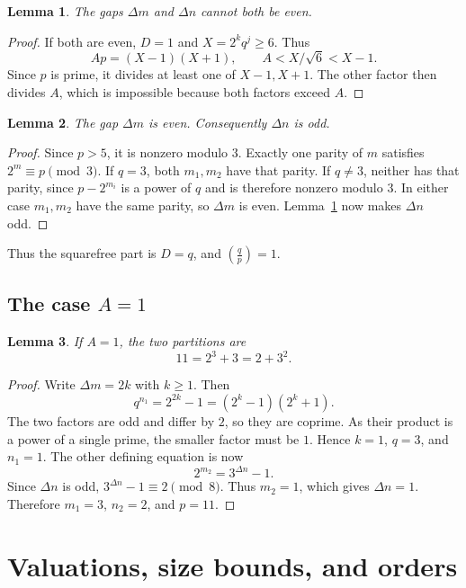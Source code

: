 \documentclass[11pt]{article}
\newtheorem{lemma}{Lemma}
\begin{document}
\begin{lemma}\label{lem:squares}
The gaps $\Delta m$ and $\Delta n$ cannot both be even.
\end{lemma}
\begin{proof}
If both are even, $D=1$ and $X=2^kq^j\geq6$. Thus
\[
Ap=(X-1)(X+1),\qquad A<X/\sqrt6<X-1.
\]
Since $p$ is prime, it divides at least one of $X-1,X+1$.
The other factor then divides $A$, which is impossible because both
factors exceed $A$.
\end{proof}

\begin{lemma}\label{lem:parity}
The gap $\Delta m$ is even. Consequently $\Delta n$ is odd.
\end{lemma}
\begin{proof}
Since $p>5$, it is nonzero modulo $3$. Exactly one parity of $m$
satisfies $2^m\equiv p\pmod3$.
If $q=3$, both $m_1,m_2$ have that parity.
If $q\neq3$, neither has that parity, since $p-2^{m_i}$ is a power
of $q$ and is therefore nonzero modulo $3$.
In either case $m_1,m_2$ have the same parity, so $\Delta m$ is even.
Lemma~\ref{lem:squares} now makes $\Delta n$ odd.
\end{proof}

Thus the squarefree part is $D=q$, and $\left(\frac{q}{p}\right)=1$.

\subsection{\texorpdfstring{The case $A=1$}{The case A=1}}

\begin{lemma}\label{lem:Aone}
If $A=1$, the two partitions are
\[
11=2^3+3=2+3^2.
\]
\end{lemma}
\begin{proof}
Write $\Delta m=2k$ with $k\geq1$. Then
\[
q^{n_1}=2^{2k}-1=(2^k-1)(2^k+1).
\]
The two factors are odd and differ by $2$, so they are coprime.
As their product is a power of a single prime, the smaller factor
must be $1$. Hence $k=1$, $q=3$, and $n_1=1$.
The other defining equation is now
\[
2^{m_2}=3^{\Delta n}-1.
\]
Since $\Delta n$ is odd, $3^{\Delta n}-1\equiv2\pmod8$.
Thus $m_2=1$, which gives $\Delta n=1$.
Therefore $m_1=3$, $n_2=2$, and $p=11$.
\end{proof}

\section{Valuations, size bounds, and orders}
\label{sec:bounds}
\end{document}
